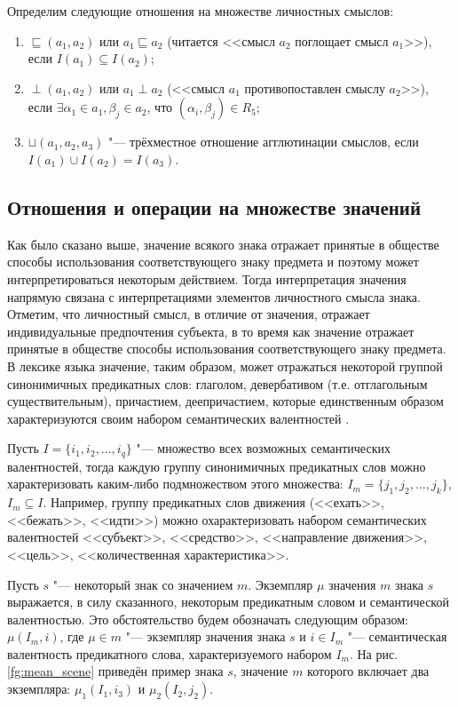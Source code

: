 Определим следующие отношения на множестве личностных смыслов:
\begin{enumerate}
	\item $\sqsubseteq(a_1,a_2)$ или $a_1\sqsubseteq a_2$ (читается <<смысл $a_2$ поглощает смысл $a_1$>>), если $I(a_1)\subseteq I(a_2)$;
	\item $\perp(a_1,a_2)$  или $a_1\perp a_2$ (<<смысл $a_1$ противопоставлен смыслу $a_2$>>), если $\exists\alpha_1\in a_1,\beta_j\in a_2$, что $(\alpha_i,\beta_j)\in R_5$;
	\item $\sqcup(a_1,a_2,a_3)$ "--- трёхместное отношение агглютинации смыслов, если $I(a_1)\cup I(a_2)=I(a_3)$.
\end{enumerate}

\subsection{Отношения и операции на множестве значений}

Как было сказано выше, значение всякого знака отражает принятые в обществе способы использования соответствующего знаку предмета и поэтому может интерпретироваться некоторым действием. Тогда интерпретация значения напрямую связана с интерпретациями элементов личностного смысла знака. Отметим, что личностный смысл, в отличие от значения, отражает индивидуальные предпочтения субъекта, в то время как значение отражает принятые в обществе способы использования соответствующего знаку предмета. В лексике языка значение, таким образом, может отражаться некоторой группой синонимичных предикатных слов: глаголом, девербативом (т.е. отглагольным существительным), причастием, деепричастием, которые единственным образом характеризуются своим набором семантических валентностей \cite{Schank1972}.

Пусть $I=\{i_1,i_2,\dots,i_q\}$ "--- множество всех возможных семантических валентностей, тогда каждую группу синонимичных предикатных слов можно характеризовать каким-либо подмножеством этого множества: $I_m=\{j_1,j_2,\dots,j_k\}$, $I_m\subseteq I$. Например, группу предикатных слов движения (<<ехать>>, <<бежать>>, <<идти>>) можно охарактеризовать набором семантических валентностей <<субъект>>, <<средство>>, <<направление движения>>, <<цель>>, <<количественная характеристика>>. 

Пусть $s$ "--- некоторый знак со значением $m$. Экземпляр $\mu$ значения $m$ знака $s$ выражается, в силу сказанного, некоторым предикатным словом и семантической валентностью. Это обстоятельство будем обозначать следующим образом: $\mu(I_m,i)$, где $\mu\in m$ "--- экземпляр значения знака $s$ и $i\in I_m$ "--- семантическая валентность предикатного слова, характеризуемого набором $I_m$. На рис. \ref{fg:mean_scene} приведён пример знака $s$, значение $m$ которого включает два экземпляра: $\mu_1(I_1,i_3)$ и $\mu_2(I_2,j_2)$.

